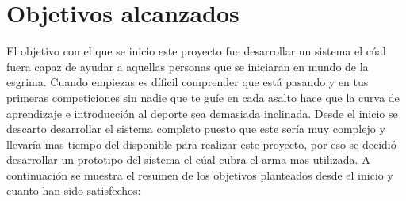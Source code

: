 \section{Objetivos alcanzados}

El objetivo con el que se inicio este proyecto fue desarrollar un sistema el cúal
fuera capaz de ayudar a aquellas personas que se iniciaran en mundo de la esgrima.
Cuando empiezas es díficil comprender que está pasando y en tus primeras competiciones
sin nadie que te guíe en cada asalto hace que la curva de aprendizaje e introducción
al deporte sea demasiada inclinada. Desde el inicio se descarto desarrollar el sistema
completo puesto que este sería muy complejo y llevaría mas tiempo del disponible para
realizar este proyecto, por eso se decidió desarrollar un prototipo del sistema el cúal
cubra el arma mas utilizada. A continuación se muestra el resumen de los objetivos planteados
desde el inicio y cuanto han sido satisfechos:


